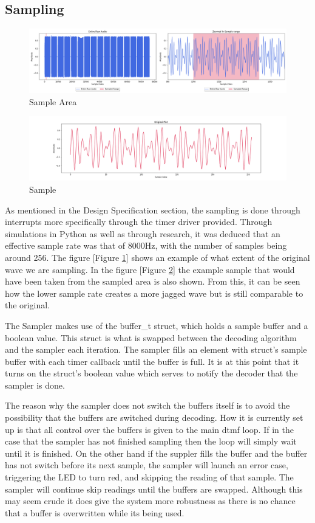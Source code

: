 \documentclass{cce2014-design}
\begin{document}
\subsection{Sampling}
\begin{figure}
	\center
	\includegraphics[width=\textwidth]{img/Sample Area.png}
	\caption{\label{SampleArea}Sample Area}
\end{figure}
\begin{figure}
	\center
	\includegraphics[width=\textwidth]{img/Sample.png}
	\caption{\label{Sample}Sample}
\end{figure}
As mentioned in the Design Specification section, the sampling is done through
interrupts more specifically through the timer driver provided. Through
simulations in Python as well as through research, it was deduced that an 
effective sample rate was that of 8000Hz, with the number of samples being around 
256. The figure [Figure \ref{SampleArea}] shows an example of what extent of the 
original wave we are sampling. In the figure [Figure \ref{Sample}] the example 
sample that would have been taken from the sampled area is also shown. From this, 
it can be seen how the lower sample rate creates a more jagged wave but is still 
comparable to the original.

The Sampler makes use of the buffer\_t struct, which holds a sample buffer and
a boolean value. This struct is what is swapped between the decoding algorithm 
and the sampler each iteration. The sampler fills an element with struct's sample 
buffer with each timer callback until the buffer is full. It is at this point that 
it turns on the struct's boolean value which serves to notify the decoder that the 
sampler is done.

The reason why the sampler does not switch the buffers itself is to avoid the 
possibility that the buffers are switched during decoding. How it is currently set
up is that all control over the buffers is given to the main dtmf loop. If in the
case that the sampler has not finished sampling then the loop will simply wait until
it is finished. On the other hand if the suppler fills the buffer and the buffer has
not switch before its next sample, the sampler will launch an error case, triggering
the LED to turn red, and skipping the reading of that sample. The sampler will continue
skip readings until the buffers are swapped. Although this may seem crude it does give
the system more robustness as there is no chance that a buffer is overwritten while 
its being used.
\end{document}
